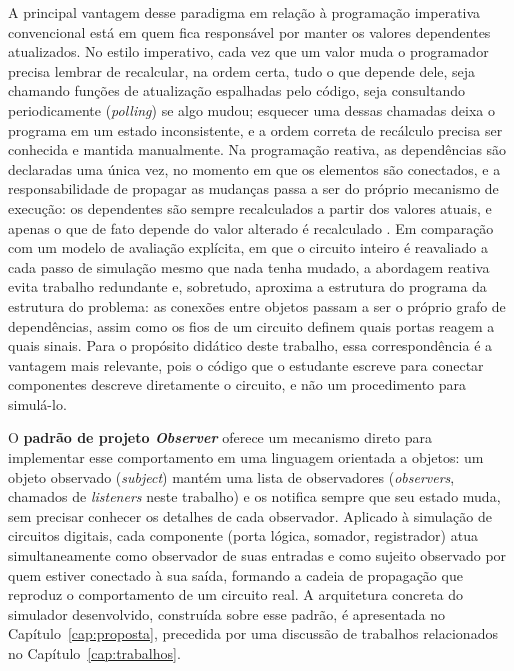 A principal vantagem desse paradigma em relação à programação imperativa convencional está em quem fica responsável por manter os valores dependentes atualizados. No estilo imperativo, cada vez que um valor muda o programador precisa lembrar de recalcular, na ordem certa, tudo o que depende dele, seja chamando funções de atualização espalhadas pelo código, seja consultando periodicamente (\textit{polling}) se algo mudou; esquecer uma dessas chamadas deixa o programa em um estado inconsistente, e a ordem correta de recálculo precisa ser conhecida e mantida manualmente. Na programação reativa, as dependências são declaradas uma única vez, no momento em que os elementos são conectados, e a responsabilidade de propagar as mudanças passa a ser do próprio mecanismo de execução: os dependentes são sempre recalculados a partir dos valores atuais, e apenas o que de fato depende do valor alterado é recalculado \cite{bainomugisha2013}. Em comparação com um modelo de avaliação explícita, em que o circuito inteiro é reavaliado a cada passo de simulação mesmo que nada tenha mudado, a abordagem reativa evita trabalho redundante e, sobretudo, aproxima a estrutura do programa da estrutura do problema: as conexões entre objetos passam a ser o próprio grafo de dependências, assim como os fios de um circuito definem quais portas reagem a quais sinais. Para o propósito didático deste trabalho, essa correspondência é a vantagem mais relevante, pois o código que o estudante escreve para conectar componentes descreve diretamente o circuito, e não um procedimento para simulá-lo.

O \textbf{padrão de projeto \textit{Observer}} \cite{gamma1994} oferece um mecanismo direto para implementar esse comportamento em uma linguagem orientada a objetos: um objeto observado (\textit{subject}) mantém uma lista de observadores (\textit{observers}, chamados de \textit{listeners} neste trabalho) e os notifica sempre que seu estado muda, sem precisar conhecer os detalhes de cada observador. Aplicado à simulação de circuitos digitais, cada componente (porta lógica, somador, registrador) atua simultaneamente como observador de suas entradas e como sujeito observado por quem estiver conectado à sua saída, formando a cadeia de propagação que reproduz o comportamento de um circuito real. A arquitetura concreta do simulador desenvolvido, construída sobre esse padrão, é apresentada no Capítulo~\ref{cap:proposta}, precedida por uma discussão de trabalhos relacionados no Capítulo~\ref{cap:trabalhos}.

